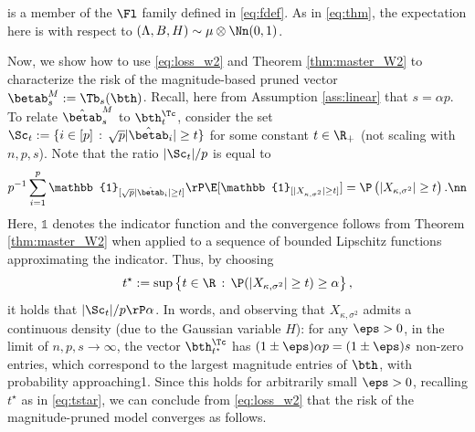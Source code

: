 is a member of the $\Fl$ family defined in \eqref{eq:fdef}.
As in \eqref{eq:thm}, the expectation here is with respect to $(\Lambda,B,H)\sim\mu\otimes\Nn(0,1)$. 

Now, we show how to use \eqref{eq:loss_w2} and Theorem \ref{thm:master_W2} to characterize the risk of the magnitude-based pruned vector $\betab^M_s:=\Tb_s(\bth)$. Recall, here from Assumption \ref{ass:linear} that $s=\alpha p$. To relate $\hat{\betab}^M_s$ to $\bth^\Tc_t$, consider the set  $\Sc_t:=\{i\in[p]\,:\,\sqrt{p}|\hat\betab_i| \geq t \}$ for some constant $t\in\R_+$ (not scaling with $n,p,s$). Note that the ratio ${|\Sc_t|}/{p}$ is equal to
\begin{align}
p^{-1}\sum_{i=1}^p\mathbb{1}_{[\sqrt{p}|\hat\betab_i| \geq t]} \rP \E[\mathbb{1}_{[|X_{\kappa,\sigma^2}|\geq t]}] = \P\left(|X_{\kappa,\sigma^2}|\geq t\right).\nn
\end{align}
Here, $\mathbb{1}$ denotes the indicator function and the convergence follows from Theorem \ref{thm:master_W2} when applied to a sequence of bounded Lipschitz functions approximating the indicator. Thus, by choosing 
\begin{align}\label{eq:tstar}
t^\star:=\sup\left\{t\in\R\,:\, \P(|X_{\kappa,\sigma^2}|\geq t) \geq \alpha \right\},
\end{align}
it holds that ${|\Sc_t|}/{p}\rP\alpha$. In words, and {observing that $X_{\kappa,\sigma^2}$ admits a continuous density (due to the Gaussian variable $H$)}: for any  $\eps>0$, in the limit of $n,p,s\rightarrow\infty$, the vector $\bth^\Tc_{t^\star}$ has $(1\pm\eps) \alpha p= (1\pm\eps) s$ non-zero entries, which correspond to the largest magnitude entries of $\bth$, with probability approaching1. Since this holds for arbitrarily small $\eps>0$, recalling $t^\star$ as in \eqref{eq:tstar}, we can conclude from \eqref{eq:loss_w2} that the risk of the magnitude-pruned model converges as follows.
